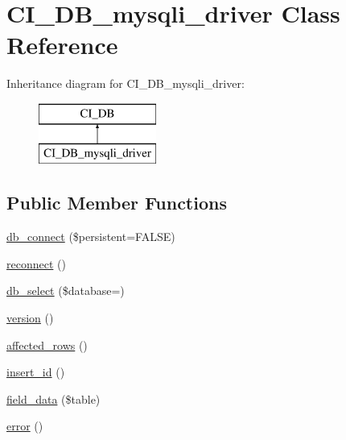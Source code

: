 \hypertarget{class_c_i___d_b__mysqli__driver}{}\section{C\+I\+\_\+\+D\+B\+\_\+mysqli\+\_\+driver Class Reference}
\label{class_c_i___d_b__mysqli__driver}
Inheritance diagram for C\+I\+\_\+\+D\+B\+\_\+mysqli\+\_\+driver\+:\begin{figure}[H]
\begin{center}
\leavevmode
\includegraphics[height=2.000000cm]{class_c_i___d_b__mysqli__driver}
\end{center}
\end{figure}
\subsection*{Public Member Functions}
\begin{DoxyCompactItemize}
\item 
\mbox{\hyperlink{class_c_i___d_b__mysqli__driver_ad0c0d23f4212c56faba67b8c39bb18d4}{db\+\_\+connect}} (\$persistent=F\+A\+L\+SE)
\item 
\mbox{\hyperlink{class_c_i___d_b__mysqli__driver_ad6af993a1669a890b9cdcaa32ba42acf}{reconnect}} ()
\item 
\mbox{\hyperlink{class_c_i___d_b__mysqli__driver_a7e553afc081688d1ff16708f6c00f7f3}{db\+\_\+select}} (\$database=\textquotesingle{}\textquotesingle{})
\item 
\mbox{\hyperlink{class_c_i___d_b__mysqli__driver_aa15ddf57e8a05fe5fbdcdfe4a58d3170}{version}} ()
\item 
\mbox{\hyperlink{class_c_i___d_b__mysqli__driver_a3af0b15ac380ecee959ec5f74fabb0f2}{affected\+\_\+rows}} ()
\item 
\mbox{\hyperlink{class_c_i___d_b__mysqli__driver_ad44d39922f18c93a8146cb32c9c0b293}{insert\+\_\+id}} ()
\item 
\mbox{\hyperlink{class_c_i___d_b__mysqli__driver_a9ba0959253b80d6fd2b48724d4fbeb1d}{field\+\_\+data}} (\$table)
\item 
\mbox{\hyperlink{class_c_i___d_b__mysqli__driver_a476e6c22ebf261f496c03afa4d98af3c}{error}} ()
\end{DoxyCompactItemize}
